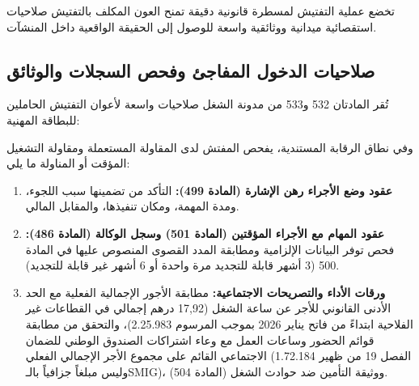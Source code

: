 تخضع عملية التفتيش لمسطرة قانونية دقيقة تمنح العون المكلف بالتفتيش صلاحيات استقصائية ميدانية ووثائقية واسعة للوصول إلى الحقيقة الواقعية داخل المنشآت.

\subsection{صلاحيات الدخول المفاجئ وفحص السجلات والوثائق}
تُقر المادتان \textenglish{532} و\textenglish{533} من مدونة الشغل صلاحيات واسعة لأعوان التفتيش الحاملين للبطاقة المهنية:


وفي نطاق الرقابة المستندية، يفحص المفتش لدى المقاولة المستعملة ومقاولة التشغيل المؤقت أو المناولة ما يلي:
\begin{enumerate}[leftmargin=*, itemsep=5pt]
    \item \textbf{عقود وضع الأجراء رهن الإشارة (المادة \textenglish{499}):} التأكد من تضمينها سبب اللجوء، ومدة المهمة، ومكان تنفيذها، والمقابل المالي.
    \item \textbf{عقود المهام مع الأجراء المؤقتين (المادة \textenglish{501}) وسجل الوكالة (المادة \textenglish{486}):} فحص توفر البيانات الإلزامية ومطابقة المدد القصوى المنصوص عليها في المادة \textenglish{500} (\textenglish{3} أشهر قابلة للتجديد مرة واحدة أو \textenglish{6} أشهر غير قابلة للتجديد).
    \item \textbf{ورقات الأداء والتصريحات الاجتماعية:} مطابقة الأجور الإجمالية الفعلية مع الحد الأدنى القانوني للأجر عن ساعة الشغل (\textenglish{17,92} درهم إجمالي في القطاعات غير الفلاحية ابتداءً من فاتح يناير \textenglish{2026} بموجب المرسوم \textenglish{2.25.983})، والتحقق من مطابقة قوائم الحضور وساعات العمل مع وعاء اشتراكات الصندوق الوطني للضمان الاجتماعي القائم على مجموع الأجر الإجمالي الفعلي (الفصل \textenglish{19} من ظهير \textenglish{1.72.184} وليس مبلغاً جزافياً بالـ\textenglish{SMIG})، ووثيقة التأمين ضد حوادث الشغل (المادة \textenglish{504}).
\end{enumerate}

